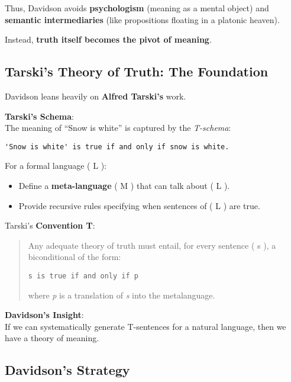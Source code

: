 \documentclass[12pt]{article}
\newcommand{\tightlist}{\itemsep 0pt\parskip 0pt\parsep 0pt}
\begin{document}
Thus, Davidson avoids \textbf{psychologism} (meaning as a mental object)
and \textbf{semantic intermediaries} (like propositions floating in a
platonic heaven).

Instead, \textbf{truth itself becomes the pivot of meaning}.

\hypertarget{tarskis-theory-of-truth-the-foundation}{%
\subsection{Tarski's Theory of Truth: The
Foundation}\label{tarskis-theory-of-truth-the-foundation}}

Davidson leans heavily on \textbf{Alfred Tarski's} work.

\textbf{Tarski's Schema}:\\
The meaning of ``Snow is white'' is captured by the \emph{T-schema}:

\begin{verbatim}
'Snow is white' is true if and only if snow is white.
\end{verbatim}

For a formal language ( L ):

\begin{itemize}
\tightlist
\item
  Define a \textbf{meta-language} ( M ) that can talk about ( L ).
\item
  Provide recursive rules specifying when sentences of ( L ) are true.
\end{itemize}

Tarski's \textbf{Convention T}:

\begin{quote}
Any adequate theory of truth must entail, for every sentence ( s ), a
biconditional of the form:

\texttt{\textquotesingle{}s\textquotesingle{}\ is\ true\ if\ and\ only\ if\ p}

where \emph{p} is a translation of \emph{s} into the metalanguage.
\end{quote}

\textbf{Davidson's Insight}:\\
If we can systematically generate T-sentences for a natural language,
then we have a theory of meaning.

\hypertarget{davidsons-strategy}{%
\subsection{Davidson's Strategy}\label{davidsons-strategy}}
\end{document}
